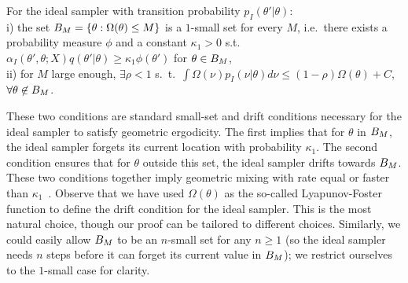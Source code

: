 \begin{assumption}
For the ideal sampler with transition probability $p_I(\theta'|\theta)$: \\
i) the set $B_M=\{\theta:\Omega(\theta)\le M \}$ is a $1$-small set for
every
$M$, i.e.\ there exists a probability measure $\phi$ and a constant
$\kappa_1 > 0$ s.t.\ %
$\alpha_I(\theta', \theta; X) q(\theta' | \theta) \ge \kappa_1 \phi(\theta')$
 for $\theta \in B_M$, \\
ii) for $M$ large enough, $\exists \rho < 1$ s.\ t.\
$\int \Omega(\nu) p_I(\nu|\theta) d\nu
\leq (1-\rho) \Omega(\theta)+C$, $\forall \theta \not\in B_M$.
  \label{asmp:ideal_geom}
\end{assumption}
\noindent %
These two conditions are standard
small-set and drift conditions necessary for the ideal sampler to satisfy
geometric ergodicity. The first implies that for $\theta$ in
$B_M$, the ideal sampler forgets its current
location with probability $\kappa_1$. The second condition ensures that
for $\theta$ outside this set, the ideal sampler drifts towards
$B_M$. These two conditions together imply geometric
mixing with rate equal or faster than $\kappa_1$~\cite{meyn2009}.
Observe that we have used $\Omega(\theta)$ as the so-called 
Lyapunov-Foster function to define the drift condition for the ideal 
sampler. %
This is the most natural choice,
though our proof can be tailored to different choices. Similarly, we
could easily allow $B_M$ to be an $n$-small set for any $n\ge 1$ (so
the ideal sampler needs $n$ steps before it can forget its current
value in $B_M$); we restrict ourselves to the $1$-small case for
clarity.




